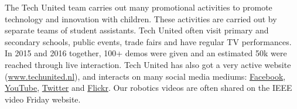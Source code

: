 The Tech United team carries out many promotional activities to promote technology and innovation with children. These activities are carried out by separate teams of student assistants. Tech United often visit primary and secondary schools, public events, trade fairs and have regular TV performances. In 2015 and 2016 together, 100+ demos were given and an estimated 50k were reached through live interaction.
Tech United has also got a very active website (\url{www.techunited.nl}), and interacts on many social media mediums: \href{https://www.facebook.com/techunited}{Facebook}, \href{https://www.youtube.com/user/TechUnited}{YouTube}, \href{https://twitter.com/TechUnited}{Twitter} and \href{https://www.flickr.com/photos/techunited/}{Flickr}. Our robotics videos are often shared on the IEEE video Friday website.